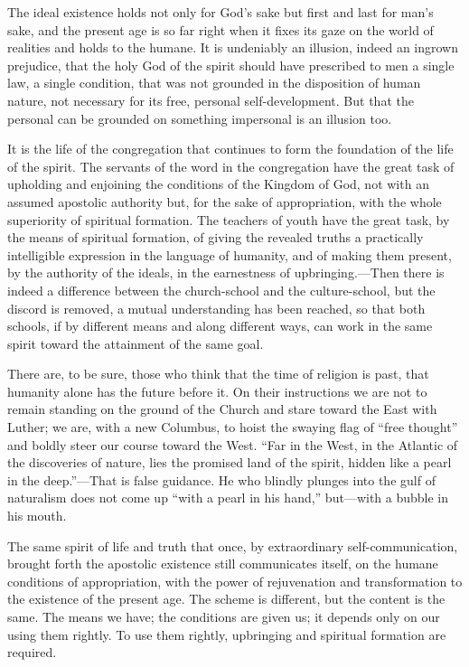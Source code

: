 \documentclass[12pt,a4paper,openany]{book}
\newcommand{\opage}[1]{\marginnote{\footnotesize\textit{[#1]}}}
\begin{document}
The ideal existence holds not only for God's sake but first and last for
man's sake, and the present age is so far right when it fixes its gaze on
the world of realities and holds to the humane. It is undeniably an
illusion, indeed an ingrown prejudice, that the holy God of the spirit
should have prescribed to men a single law, a single condition, that was
not grounded in the disposition of human nature, not necessary for its
free, personal self-development. But that the personal can be grounded
on something impersonal is an illusion too.

It is the life of the congregation that continues to form the foundation
of the life of the spirit. The servants of the word in the congregation
have the great task of upholding and enjoining the conditions of the
Kingdom of God, not with an assumed apostolic \opage{109}authority but, for the sake
of appropriation, with the whole superiority of spiritual formation. The
teachers of youth have the great task, by the means of spiritual
formation, of giving the revealed truths a practically intelligible
expression in the language of humanity, and of making them present, by
the authority of the ideals, in the earnestness of upbringing.---Then
there is indeed a difference between the church-school and the
culture-school, but the discord is removed, a mutual understanding has
been reached, so that both schools, if by different means and along
different ways, can work in the same spirit toward the attainment of the
same goal.

There are, to be sure, those who think that the time of religion is past,
that humanity alone has the future before it. On their instructions we
are not to remain standing on the ground of the Church and stare toward
the East with Luther; we are, with a new Columbus, to hoist the swaying
flag of ``free thought'' and boldly steer our course toward the West. ``Far
in the West, in the Atlantic of the discoveries of nature, lies the
promised land of the spirit, hidden like a pearl in the deep.''---That is
false guidance. He who blindly plunges into the gulf of naturalism does
not come up ``with a pearl in his hand,'' but---with a bubble in his
mouth.

The same spirit of life and truth that once, by extraordinary
self-communication, brought forth the apostolic existence still
communicates itself, on the humane conditions of appropriation, with the
power of rejuvenation and transformation to the existence of the present
age. The scheme is different, but the content is the same. The means we
have; the conditions are given us; it depends only on our using them
rightly. To use them rightly, upbringing and spiritual formation are
required.
\end{document}
